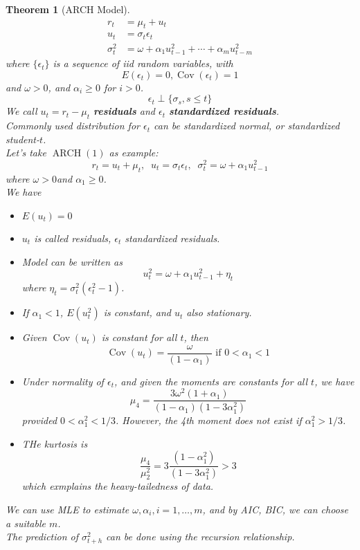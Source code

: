 \documentclass[11pt]{article}
\newtheorem{theorem}{Theorem}[section]
\theoremstyle{definition}
\DeclareMathOperator{\cov}{Cov}
\DeclareMathOperator{\ARCH}{ARCH}
\begin{document}
\begin{theorem}[ARCH Model]
\normalfont 
\begin{align*}
r_t &= \mu_t + u_t\\
u_t &=\sigma_t\epsilon_t\\
\sigma_t^2 &=\omega + \alpha_1u_{t-1}^2 +\cdots + \alpha_mu_{t-m}^2
\end{align*}
where $\{\epsilon_t\}$ is a sequence of iid random variables, with
\[
E(\epsilon_t) = 0, \cov(\epsilon_t) = 1
\]
and $\omega>0$, and $\alpha_i\geq 0$ for $i>0$.
\[
\epsilon_t \perp \{\sigma_s, s\leq t\}
\]
We call $u_t=r_t-\mu_t$ \textbf{residuals} and $\epsilon_t$ \textbf{standardized residuals}.\\
Commonly used distribution for $\epsilon_t$ can be standardized normal, or standardized student-$t$.\\
Let's take $\ARCH(1)$ as example:
\[
r_t = u_t + \mu_t,\;\; u_t=\sigma_t\epsilon_t,\;\;\sigma_t^2 = \omega + \alpha_1u_{t-1}^2
\]
where $\omega>0$and $\alpha_1\geq 0$.\\
We have
\begin{itemize}
  \item $E(u_t) = 0$
  \item $u_t$ is called residuals, $\epsilon_t$ standardized residuals.
  \item Model can be written as
  \[
u_t^2 = \omega + \alpha_1 u_{t-1}^2 + \eta_t
  \]
where $\eta_t = \sigma_t^2(\epsilon_t^2 - 1)$.
  \item If $\alpha_1<1$, $E(u_t^2)$ is constant, and $u_t$ also stationary.
  \item Given $\cov(u_t)$ is constant for all $t$, then
  \[
\cov(u_t) = \frac{\omega}{(1-\alpha_1)}\text{ if } 0 < \alpha_1 < 1
  \] 
  \item Under normality of $\epsilon_t$, and given the moments are constants for all $t$, we have
  \[
\mu_4 = \frac{3\omega^2(1+\alpha_1)}{(1-\alpha_1)(1-3\alpha_1^2)}
  \]
provided $0<\alpha_1^2<1/3$. However, the 4th moment does not exist if $\alpha_1^2>1/3$.
  \item THe kurtosis is
  \[
\frac{\mu_4}{\mu_2^2} = 3\frac{(1-\alpha_1^2)}{(1-3\alpha_1^2)}>3
  \]
  which exmplains the heavy-tailedness of data.
\end{itemize}
We can use MLE to estimate $\omega, \alpha_i, i = 1,\ldots, m$, and by AIC, BIC, we can choose a suitable $m$.\\
The prediction of $\sigma_{t+h}^2$ can be done using the recursion relationship. 
\end{theorem}
\end{document}
